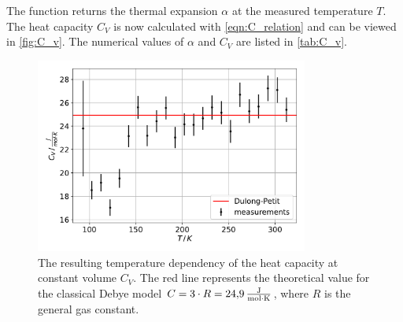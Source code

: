 The function returns the thermal expansion $\alpha$ at the measured temperature $T$.
The heat capacity $C_V$ is now calculated with \autoref{eqn:C_relation} and can be viewed in \autoref{fig:C_v}.
The numerical values of $\alpha$ and $C_V$ are listed in \autoref{tab:C_v}.
\begin{figure}
    \centering
    \includegraphics[width=0.8\textwidth]{content/plots/C_v.pdf}
    \caption{The resulting temperature dependency of the heat capacity at constant volume $C_V$.
    The red line represents the theoretical value for the classical Debye model $C = 3 \cdot R = \qty{24.9}{\frac{\joule}{\mol \cdot \kelvin}}$, where $R$ is the general gas constant.
    }
    \label{fig:C_v}
\end{figure}
